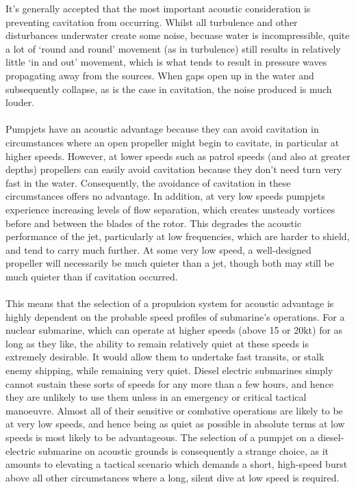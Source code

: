 \documentclass{article}\usepackage[]{graphicx}\usepackage[]{color}
\begin{document}
\begin{tcolorbox}[width=0.8\textwidth, center, colback=blue!5!white,colframe=blue!75!black, title= Exactly when and how are pumpjets quieter than propellers?]
It's generally accepted that the most important acoustic consideration is preventing cavitation from occurring. Whilst all turbulence and other disturbances underwater create some noise, becuase water is incompressible, quite a lot of `round and round' movement (as in turbulence) still results in relatively little `in and out' movement, which is what tends to result in pressure waves propagating away from the sources.  When gaps open up in the water and subsequently collapse, as is the case in cavitation, the noise produced is much louder.
\\
\\
Pumpjets have an acoustic advantage because they can avoid cavitation in circumstances where an open propeller might begin to cavitate, in particular at higher speeds. However, at lower speeds such as patrol speeds (and also at greater depths) propellers can easily avoid cavitation because they don't need turn very fast in the water. Consequently, the avoidance of cavitation in these circumstances offers no advantage.  In addition, at very low speeds pumpjets experience increasing levels of flow separation, which creates unsteady vortices before and between the blades of the rotor.  This degrades the acoustic performance of the jet, particularly at low frequencies, which are harder to shield, and tend to carry much further. At some very low speed, a well-designed propeller will necessarily be much quieter than a jet, though both may still be much quieter than if cavitation occurred.
\\
\\
This means that the selection of a propulsion system for acoustic advantage is highly dependent on the probable speed profiles of submarine's operations. For a nuclear submarine, which can operate at higher speeds (above 15 or 20kt) for as long as they like, the ability to remain relatively quiet at these speeds is extremely desirable. It would allow them to undertake fast transits, or stalk enemy shipping, while remaining very quiet.  Diesel electric submarines simply cannot sustain these sorts of speeds for any more than a few hours, and hence they are unlikely to use them unless in an emergency or critical tactical manoeuvre.  Almost all of their sensitive or combative operations are likely to be at very low speeds, and hence being as quiet as possible in absolute terms at low speeds is most likely to be advantageous.  The selection of a pumpjet on a diesel-electric submarine on acoustic grounds is consequently a strange choice, as it amounts to elevating a tactical scenario which demands a short, high-speed burst above all other circumstances where a long, silent dive at low speed is required.
\end{tcolorbox}
\end{document}
